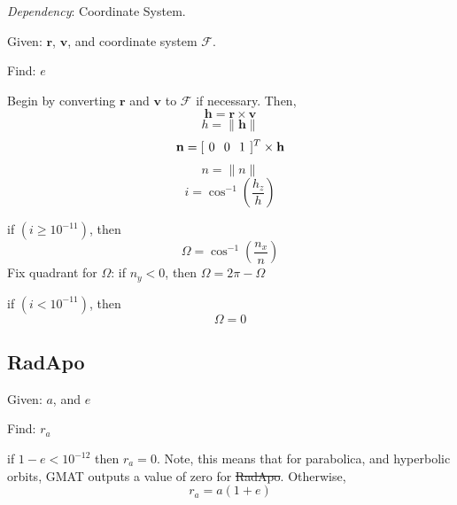 \noindent \textit{Dependency}:  Coordinate System.

\noindent Given:  $\mathbf{r}$, $\mathbf{v}$, and coordinate system
$\mathcal{F}$.

\noindent Find:  $e$

Begin by converting  $\mathbf{r}$ and $\mathbf{v}$ to  $\mathcal{F}$
if necessary.  Then,
\begin{equation}
     \mathbf{h} = \mathbf{r} \times \mathbf{v}
\end{equation}
%
\begin{equation}
     h = \|\mathbf{h} \|
\end{equation}
%
\begin{equation}
     \mathbf{n} = [ \hspace{0.05 in} 0 \hspace{0.1 in} 0 \hspace{0.1 in} 1 \hspace{0.05
     in}]^T \times \mathbf{h}
\end{equation}
%
\begin{equation}
     n = \| n\|
\end{equation}
%
\begin{equation}
     i = \cos^{-1}\left(\frac{h_z}{h}\right)
\end{equation}
%


\noindent if  $(i \geq 10^{-11})$, then
%
\begin{equation}
    \Omega = \cos^{-1}\left(\frac{n_x}{n}\right)
\end{equation}
%
Fix quadrant for $\Omega$: if $n_y < 0$, then $\Omega = 2\pi -
\Omega$


\noindent if  $(i < 10^{-11})$, then
%
\begin{equation}
    \Omega = 0
\end{equation}


\subsection{RadApo}

Given:  $a$, and $e$

\noindent Find:  $r_a$

\noindent  if $ 1 - e  < 10^{-12}$  then $r_a = 0$.  Note, this
means that for parabolica, and hyperbolic orbits, GMAT outputs a
value of zero for \st{RadApo}.
%
\noindent Otherwise,
%
\begin{equation}
    r_a = a(1+e)
\end{equation}

